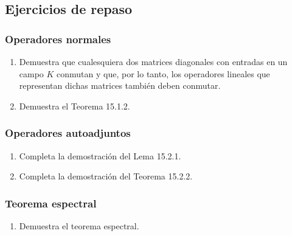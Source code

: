 \documentclass[notasLineal]{subfiles}
\begin{document}
\subsection*{Ejercicios de repaso}

\subsubsection*{Operadores normales}
\begin{enumerate}
    \item Demuestra que cualesquiera dos matrices diagonales con entradas en un campo $K$ conmutan y que, por lo tanto, los operadores lineales que representan dichas matrices también deben conmutar.
    \item Demuestra el Teorema 15.1.2.
\end{enumerate}

\subsubsection*{Operadores autoadjuntos} \label{Sssec: Operadores autoadjuntos}
\begin{enumerate}
    \item Completa la demostración del Lema 15.2.1.
    \item Completa la demostración del Teorema 15.2.2.
\end{enumerate}

\subsubsection*{Teorema espectral}

\begin{enumerate}
    \item Demuestra el teorema espectral.
\end{enumerate}
\end{document}
